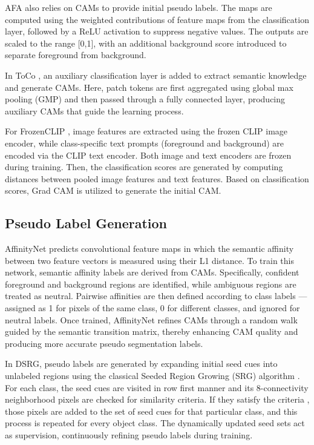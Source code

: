 AFA \cite{wsss_afa_affinity_from_attention} also relies on CAMs to provide initial pseudo labels. The maps are computed using the weighted contributions of feature maps from the classification layer, followed by a ReLU activation to suppress negative values. The outputs are scaled to the range [0,1], with an additional background score introduced to separate foreground from background.

In ToCo \cite{wsss_toco_token_contrast}, an auxiliary classification layer is added to extract semantic knowledge and generate CAMs. Here, patch tokens are first aggregated using global max pooling (GMP) and then passed through a fully connected layer, producing auxiliary CAMs that guide the learning process.

For FrozenCLIP \cite{wsss_frozen_clip}, image features are extracted using the frozen CLIP image encoder, while class-specific text prompts (foreground and background) are encoded via the CLIP text encoder. Both image and text encoders are frozen during training.  Then, the classification scores are generated by computing distances between pooled image features and text features. Based on classification scores, Grad CAM \cite{cam_grad} is utilized to generate the initial CAM.


\subsection{Pseudo Label Generation}
\label{subsec:pseudo-label-generation}
AffinityNet predicts convolutional feature maps in which the semantic affinity between two feature vectors is measured using their L1 distance. To train this network, semantic affinity labels are derived from CAMs. Specifically, confident foreground and background regions are identified, while ambiguous regions are treated as neutral. Pairwise affinities are then defined according to class labels — assigned as 1 for pixels of the same class, 0 for different classes, and ignored for neutral labels. Once trained, AffinityNet refines CAMs through a random walk guided by the semantic transition matrix, thereby enhancing CAM quality and producing more accurate pseudo segmentation labels.

In DSRG, pseudo labels are generated by expanding initial seed cues into unlabeled regions using the classical Seeded Region Growing (SRG) algorithm \cite{srg}. For each class, the seed cues are visited in row first manner and its 8-connectivity neighborhood pixels are checked for similarity criteria. If they satisfy the criteria , those pixels are added to the set of seed cues for that particular class, and this process is repeated for every object class. The dynamically updated seed sets act as supervision, continuously refining pseudo labels during training.

